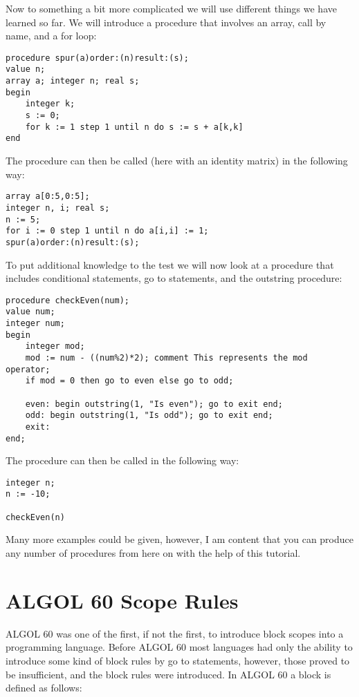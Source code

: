 \documentclass{article}
\begin{document}
Now to something a bit more complicated we will use different things we have learned so far. We will introduce a procedure that involves an array, call by name, and a for loop:

\begin{lstlisting}[language={[60]algol}]
procedure spur(a)order:(n)result:(s);
value n;
array a; integer n; real s;
begin
    integer k;
    s := 0;
    for k := 1 step 1 until n do s := s + a[k,k]
end
\end{lstlisting}

The procedure can then be called (here with an identity matrix) in the following way:

\begin{lstlisting}[language={[60]algol}]
array a[0:5,0:5];
integer n, i; real s;
n := 5;
for i := 0 step 1 until n do a[i,i] := 1;
spur(a)order:(n)result:(s);
\end{lstlisting}

To put additional knowledge to the test we will now look at a procedure that includes conditional statements, go to statements, and the outstring procedure:

\begin{lstlisting}[language={[60]algol}]
procedure checkEven(num);
value num;
integer num;
begin
    integer mod;
    mod := num - ((num%2)*2); comment This represents the mod operator;
    if mod = 0 then go to even else go to odd;
    
    even: begin outstring(1, "Is even"); go to exit end;
    odd: begin outstring(1, "Is odd"); go to exit end;
    exit:
end;
\end{lstlisting}

The procedure can then be called in the following way:

\begin{lstlisting}[language={[60]algol}]
integer n;
n := -10;

checkEven(n)
\end{lstlisting}

Many more examples could be given, however, I am content that you can produce any number of procedures from here on with the help of this tutorial.

\newpage

\section{ALGOL 60 Scope Rules} \label{scopeRule}
ALGOL 60 was one of the first, if not the first, to introduce block scopes into a programming language. Before ALGOL 60 most languages had only the ability to introduce some kind of block rules by go to statements, however, those proved to be insufficient, and the block rules were introduced. In ALGOL 60 a block is defined as follows:
\end{document}
